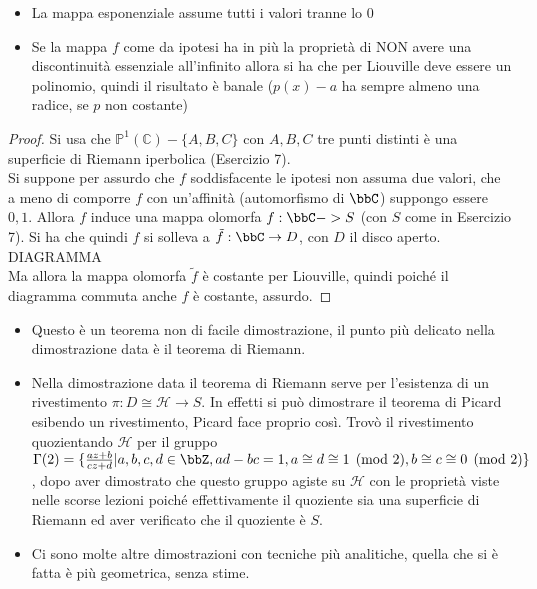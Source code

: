 \begin{osservazione}
\begin{itemize}
\item La mappa esponenziale assume tutti i valori tranne lo $0$
\item Se la mappa $f$ come da ipotesi ha in più la proprietà di NON avere una discontinuità essenziale all'infinito allora si ha che per Liouville deve essere un polinomio, quindi il risultato è banale ($p(x)-a$ ha sempre almeno una radice, se $p$ non costante)
\end{itemize}
\end{osservazione}


\begin{proof}
Si usa che $\mathbb{P}^1(\mathbb{C})\minus\{ A, B, C\}$ con $A, B, C$ tre punti distinti è una superficie di Riemann iperbolica (Esercizio 7).\\
Si suppone per assurdo che $f$ soddisfacente le ipotesi non assuma due valori, che a meno di comporre $f$ con un'affinità (automorfismo di $\bbC$) suppongo essere $0,1$.
Allora $f$ induce una mappa olomorfa $f:\bbC->S$ (con $S$ come in Esercizio 7).
Si ha che quindi $f$ si solleva a $\tilde{f}:\bbC\rightarrow D$, con $D$ il disco aperto. DIAGRAMMA \\
Ma allora la mappa olomorfa $\tilde{f}$ è costante per Liouville, quindi poiché il diagramma commuta anche $f$ è costante, assurdo.
\end{proof}

\begin{osservazione}
\begin{itemize}
\item Questo è un teorema non di facile dimostrazione, il punto più delicato nella dimostrazione data è il teorema di Riemann.
\item Nella dimostrazione data il teorema di Riemann serve per l'esistenza di un rivestimento $\pi:D\cong \mathcal{H} \rightarrow S$. In effetti si può dimostrare il teorema di Picard esibendo un rivestimento, Picard face proprio così. Trovò il rivestimento quozientando $\mathcal{H}$ per il gruppo $\Gamma(2)=\{ \frac{az+b}{cz+d} | a,b,c,d\in \bbZ, ad-bc=1, a\cong d \cong 1 \pmod{2}, b\cong c \cong 0 \pmod{2} \}$, dopo aver dimostrato che questo gruppo agiste su $\mathcal{H}$ con le proprietà viste nelle scorse lezioni poiché effettivamente il quoziente sia una superficie di Riemann ed aver verificato che il quoziente è $S$.
\item Ci sono molte altre dimostrazioni con tecniche più analitiche, quella che si è fatta è più geometrica, senza stime.
\end{itemize}
\end{osservazione}
